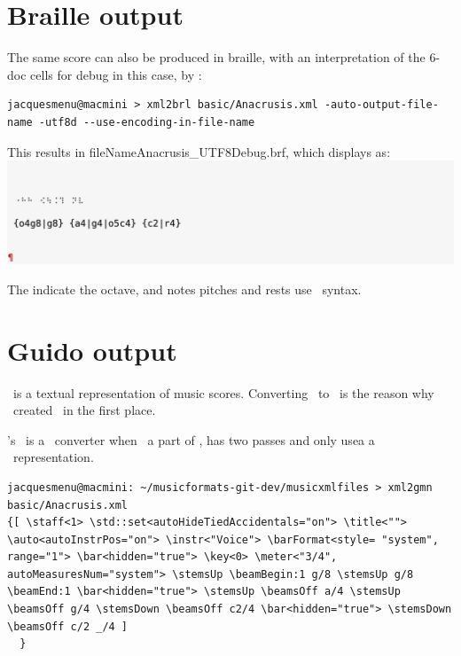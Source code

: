 \section{Braille output}

The same score can also be produced in braille, with an interpretation of the 6-doc cells for debug in this case, by \xmlToBrl:
\begin{lstlisting}[language=Terminal]
jacquesmenu@macmini > xml2brl basic/Anacrusis.xml -auto-output-file-name -utf8d --use-encoding-in-file-name
\end{lstlisting}

This results in fileName{Anacrusis_UTF8Debug.brf}, which displays as:\\
\includegraphics[scale=1]{../graphics/Anacrusis_Braille.png}

The  indicate the octave, and notes pitches and rests use \lily\ syntax.


\section{Guido output}

\guido\ is a textual representation of music scores. Converting \mxml\ to \guido\ is the reason why \fober\ created \libmusicxml\ in the first place.

\mf's \xmlToGmn\ is a \multiPass\ converter when \xmlToGuido\, a part of \libmusicxml, has two passes and only usea a \mxsrRepr\ representation.

\begin{lstlisting}[language=Terminal]
jacquesmenu@macmini: ~/musicformats-git-dev/musicxmlfiles > xml2gmn basic/Anacrusis.xml 
{[ \staff<1> \std::set<autoHideTiedAccidentals="on"> \title<""> \auto<autoInstrPos="on"> \instr<"Voice"> \barFormat<style= "system", range="1"> \bar<hidden="true"> \key<0> \meter<"3/4", autoMeasuresNum="system"> \stemsUp \beamBegin:1 g/8 \stemsUp g/8 \beamEnd:1 \bar<hidden="true"> \stemsUp \beamsOff a/4 \stemsUp \beamsOff g/4 \stemsDown \beamsOff c2/4 \bar<hidden="true"> \stemsDown \beamsOff c/2 _/4 ]
  }
\end{lstlisting}

